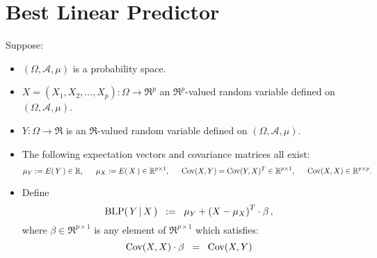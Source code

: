 

\section{Best Linear Predictor}
\setcounter{theorem}{0}
\setcounter{equation}{0}

\renewcommand{\theenumi}{\roman{enumi}}
\renewcommand{\labelenumi}{\textnormal{(\theenumi)}$\;\;$}


\begin{theorem}
\mbox{}
\vskip 0.2cm
\noindent
Suppose:
\begin{itemize}
\item
	$(\Omega,\mathcal{A},\mu)$ is a probability space.
\item
	$X = (X_{1}, X_{2}, \ldots, X_{p}) : \Omega \longrightarrow \Re^{p}$ an $\Re^{p}$-valued random variable
	defined on $(\Omega,\mathcal{A},\mu)$.
\item
	$Y : \Omega \longrightarrow \Re$ is an $\Re$-valued random variable
	defined on $(\Omega,\mathcal{A},\mu)$.
\item
	The following expectation vectors and covariance matrices all exist:
	\begin{equation*}
	\mu_{Y} := E\!\left(\,Y\,\right) \in \mathbb{R},
	\quad\;\;
	\mu_{X} := E\!\left(\,X\,\right) \in \mathbb{R}^{p \times 1},
	\quad\;\;
	\textnormal{Cov}(X,Y) = \textnormal{Cov}(Y,X)^{T} \in \mathbb{R}^{p \times 1},
	\quad\;\;
	\textnormal{Cov}(X,X) \in \mathbb{R}^{p \times p}.
	\end{equation*}
\item
	Define
	\begin{equation*}
	\textnormal{BLP}(\,Y\,\vert\,X\,)
	\;\; := \;\;
		\mu_{Y} + \left(X - \mu_{X}\right)^{T}\cdot\beta\,,
	\end{equation*}
	where $\beta \in \Re^{p\times 1}$ is any element of $\Re^{p\times 1}$ which satisfies:
	\begin{equation}\label{betaDefiningEquation}
	\textnormal{Cov}(X,X)\cdot\beta \;\; = \;\; \textnormal{Cov}(X,Y)
	\end{equation}
\end{itemize}

\end{theorem}
